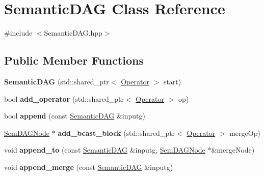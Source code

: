 \hypertarget{class_semantic_d_a_g}{\section{\-Semantic\-D\-A\-G \-Class \-Reference}
\label{class_semantic_d_a_g}
}


{\ttfamily \#include $<$\-Semantic\-D\-A\-G.\-hpp$>$}

\subsection*{\-Public \-Member \-Functions}
\begin{DoxyCompactItemize}
\item 
\hypertarget{class_semantic_d_a_g_a63c5a068d3052c88120d5dae11eadb75}{{\bfseries \-Semantic\-D\-A\-G} (std\-::shared\-\_\-ptr$<$ \hyperlink{class_operator}{\-Operator} $>$ start)}\label{class_semantic_d_a_g_a63c5a068d3052c88120d5dae11eadb75}

\item 
\hypertarget{class_semantic_d_a_g_a5af2afb0e5c1c0cd7324c5d9f1e56c07}{bool {\bfseries add\-\_\-operator} (std\-::shared\-\_\-ptr$<$ \hyperlink{class_operator}{\-Operator} $>$ op)}\label{class_semantic_d_a_g_a5af2afb0e5c1c0cd7324c5d9f1e56c07}

\item 
\hypertarget{class_semantic_d_a_g_a30e9c73863637250c511c08e45edfe10}{bool {\bfseries append} (const \hyperlink{class_semantic_d_a_g}{\-Semantic\-D\-A\-G} \&inputg)}\label{class_semantic_d_a_g_a30e9c73863637250c511c08e45edfe10}

\item 
\hypertarget{class_semantic_d_a_g_af6ec0f2552523cb3d246b46a270ae110}{\hyperlink{class_sem_d_a_g_node}{\-Sem\-D\-A\-G\-Node} $\ast$ {\bfseries add\-\_\-bcast\-\_\-block} (std\-::shared\-\_\-ptr$<$ \hyperlink{class_operator}{\-Operator} $>$ merge\-Op)}\label{class_semantic_d_a_g_af6ec0f2552523cb3d246b46a270ae110}

\item 
\hypertarget{class_semantic_d_a_g_af348609410e757f64702206b43e1d645}{void {\bfseries append\-\_\-to} (const \hyperlink{class_semantic_d_a_g}{\-Semantic\-D\-A\-G} \&inputg, \hyperlink{class_sem_d_a_g_node}{\-Sem\-D\-A\-G\-Node} $\ast$\&merge\-Node)}\label{class_semantic_d_a_g_af348609410e757f64702206b43e1d645}

\item 
\hypertarget{class_semantic_d_a_g_aaf2ecd6df14950c2df52a8364acddb1e}{void {\bfseries append\-\_\-merge} (const \hyperlink{class_semantic_d_a_g}{\-Semantic\-D\-A\-G} \&inputg)}\label{class_semantic_d_a_g_aaf2ecd6df14950c2df52a8364acddb1e}


\end{DoxyCompactItemize}
